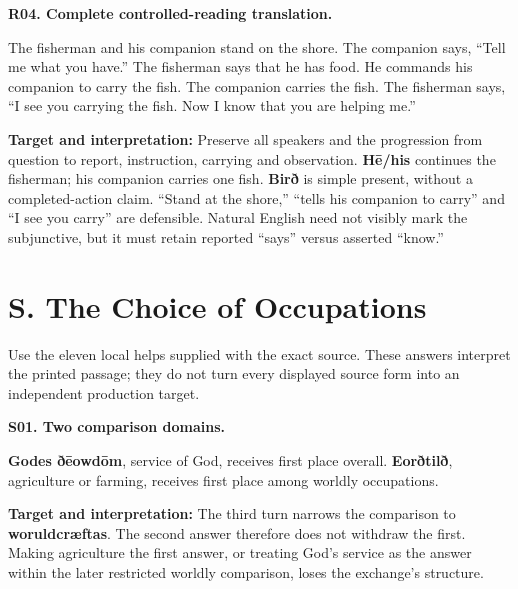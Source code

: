 \par\begin{minipage}{\linewidth}\raggedright
\textbf{R04. Complete controlled-reading translation.}

The fisherman and his companion stand on the shore. The companion says, “Tell me what you have.” The fisherman says that he has food. He commands his companion to carry the fish. The companion carries the fish. The fisherman says, “I see you carrying the fish. Now I know that you are helping me.”

\textbf{Target and interpretation:} Preserve all speakers and the progression from question to report, instruction, carrying and observation. \textbf{Hē/\allowbreak{}his} continues the fisherman; his companion carries one fish. \textbf{Birð} is simple present, without a completed-action claim. “Stand at the shore,” “tells his companion to carry” and “I see you carry” are defensible. Natural English need not visibly mark the subjunctive, but it must retain reported “says” versus asserted “know.”

\end{minipage}\par\addvspace{4pt}

\section*{S. The Choice of Occupations}

Use the eleven local helps supplied with the exact source. These answers interpret the printed passage; they do not turn every displayed source form into an independent production target.

\par\begin{minipage}{\linewidth}\raggedright
\textbf{S01. Two comparison domains.}

\textbf{Godes ðēowdōm}, service of God, receives first place overall. \textbf{Eorðtilð}, agriculture or farming, receives first place among worldly occupations.

\textbf{Target and interpretation:} The third turn narrows the comparison to \textbf{woruldcræftas}. The second answer therefore does not withdraw the first. Making agriculture the first answer, or treating God's service as the answer within the later restricted worldly comparison, loses the exchange's structure.

\end{minipage}\par\addvspace{4pt}

